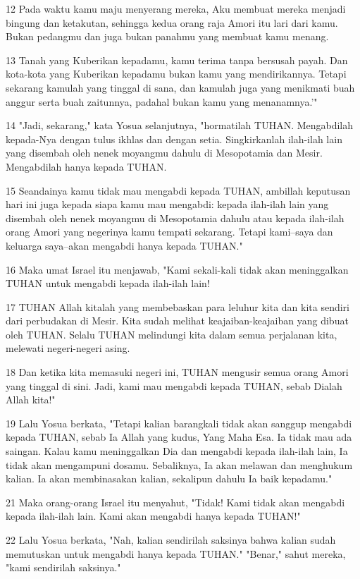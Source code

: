 \par 12 Pada waktu kamu maju menyerang mereka, Aku membuat mereka menjadi bingung dan ketakutan, sehingga kedua orang raja Amori itu lari dari kamu. Bukan pedangmu dan juga bukan panahmu yang membuat kamu menang.
\par 13 Tanah yang Kuberikan kepadamu, kamu terima tanpa bersusah payah. Dan kota-kota yang Kuberikan kepadamu bukan kamu yang mendirikannya. Tetapi sekarang kamulah yang tinggal di sana, dan kamulah juga yang menikmati buah anggur serta buah zaitunnya, padahal bukan kamu yang menanamnya.'"
\par 14 "Jadi, sekarang," kata Yosua selanjutnya, "hormatilah TUHAN. Mengabdilah kepada-Nya dengan tulus ikhlas dan dengan setia. Singkirkanlah ilah-ilah lain yang disembah oleh nenek moyangmu dahulu di Mesopotamia dan Mesir. Mengabdilah hanya kepada TUHAN.
\par 15 Seandainya kamu tidak mau mengabdi kepada TUHAN, ambillah keputusan hari ini juga kepada siapa kamu mau mengabdi: kepada ilah-ilah lain yang disembah oleh nenek moyangmu di Mesopotamia dahulu atau kepada ilah-ilah orang Amori yang negerinya kamu tempati sekarang. Tetapi kami--saya dan keluarga saya--akan mengabdi hanya kepada TUHAN."
\par 16 Maka umat Israel itu menjawab, "Kami sekali-kali tidak akan meninggalkan TUHAN untuk mengabdi kepada ilah-ilah lain!
\par 17 TUHAN Allah kitalah yang membebaskan para leluhur kita dan kita sendiri dari perbudakan di Mesir. Kita sudah melihat keajaiban-keajaiban yang dibuat oleh TUHAN. Selalu TUHAN melindungi kita dalam semua perjalanan kita, melewati negeri-negeri asing.
\par 18 Dan ketika kita memasuki negeri ini, TUHAN mengusir semua orang Amori yang tinggal di sini. Jadi, kami mau mengabdi kepada TUHAN, sebab Dialah Allah kita!"
\par 19 Lalu Yosua berkata, "Tetapi kalian barangkali tidak akan sanggup mengabdi kepada TUHAN, sebab Ia Allah yang kudus, Yang Maha Esa. Ia tidak mau ada saingan. Kalau kamu meninggalkan Dia dan mengabdi kepada ilah-ilah lain, Ia tidak akan mengampuni dosamu. Sebaliknya, Ia akan melawan dan menghukum kalian. Ia akan membinasakan kalian, sekalipun dahulu Ia baik kepadamu."
\par 21 Maka orang-orang Israel itu menyahut, "Tidak! Kami tidak akan mengabdi kepada ilah-ilah lain. Kami akan mengabdi hanya kepada TUHAN!"
\par 22 Lalu Yosua berkata, "Nah, kalian sendirilah saksinya bahwa kalian sudah memutuskan untuk mengabdi hanya kepada TUHAN." "Benar," sahut mereka, "kami sendirilah saksinya."
